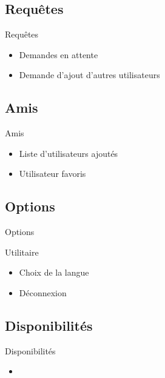 \documentclass{beamer}
\begin{document}
\subsection*{Requêtes}
\begin{frame}{Requêtes}
	\begin{itemize}
	\item{Demandes en attente}
	\item{
	Demande d'ajout d'autres utilisateurs
	}
	
	\end{itemize}
\end{frame}



\subsection*{Amis}
\begin{frame}{Amis}
	\begin{itemize}
	\item{
	Liste d'utilisateurs ajoutés
    
	}
	\item{Utilisateur favoris}
	
	\end{itemize}
\end{frame}

\subsection*{Options}
\begin{frame}{Options}
\begin{block}{Utilitaire}

\begin{itemize}
    \item{Choix de la langue}
    \item{Déconnexion}
    
\end{itemize}

\end{block}
\end{frame}

\subsection*{Disponibilités}
\begin{frame}{Disponibilités}
  \begin{itemize}
      \item{}
  \end{itemize}
\end{frame}
\end{document}
